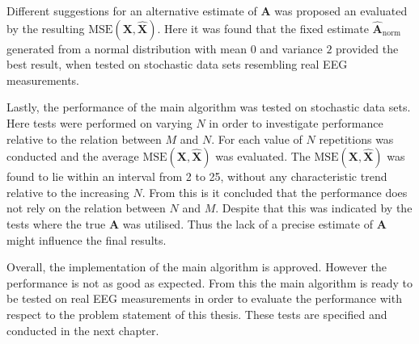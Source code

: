 Different suggestions for an alternative estimate of $\mathbf{A}$ was proposed an evaluated by the resulting $\text{MSE}(\mathbf{X}, \hat{\mathbf{X}})$. 
Here it was found that the fixed estimate $\hat{\mathbf{A}}_{\text{norm}}$ generated from a normal distribution with mean $0$ and variance $2$ provided the best result, when tested on stochastic data sets resembling real EEG measurements. 

Lastly, the performance of the main algorithm was tested on stochastic data sets. 
Here tests were performed on varying $N$ in order to investigate performance relative to the relation between $M$ and $N$. 
For each value of $N$ repetitions was conducted and the average $\text{MSE}(\mathbf{X}, \hat{\mathbf{X}})$ was evaluated. 
The $\text{MSE}(\mathbf{X}, \hat{\mathbf{X}})$ was found to lie within an interval from 2 to 25, without any characteristic trend relative to the increasing $N$. 
From this is it concluded that the performance does not rely on the relation between $N$ and $M$. 
Despite that this was indicated by the tests where the true $\mathbf{A}$ was utilised. 
Thus the lack of a precise estimate of $\mathbf{A}$ might influence the final results. 

Overall, the implementation of the main algorithm is approved. 
However the performance is not as good as expected. 
From this the main algorithm is ready to be tested on real EEG measurements in order to evaluate the performance with respect to the problem statement of this thesis. These tests are specified and conducted in the next chapter. 
